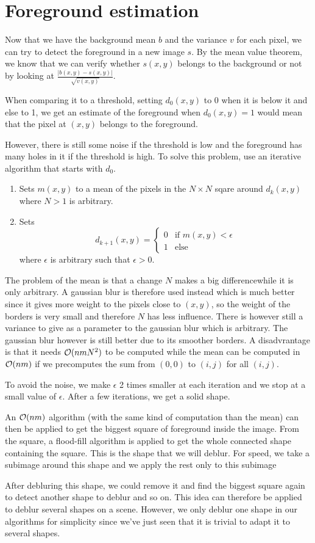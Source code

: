 \section{Foreground estimation}
Now that we have the background mean $b$ and the variance $v$ for each
pixel, we can try to detect the foreground in a new image $s$.
By the mean value theorem, we know that we can
verify whether $s(x,y)$ belongs to the background or not
by looking at $\frac{|b(x,y) - s(x,y)|}{\sqrt{v(x,y)}}$.

When comparing it to a threshold, setting $d_0(x,y)$ to 0
when it is below it and else to 1, we
get an estimate of the foreground when $d_0(x,y) = 1$ would mean
that the pixel at $(x,y)$ belongs to the foreground.

However, there is still some noise if the threshold is low
and the foreground has many holes in it if the threshold is high.
To solve this problem, use an iterative algorithm that starts with $d_0$.
\begin{enumerate}
  \item Sets $m(x,y)$ to a mean of the pixels in the $N \times N$ sqare around $d_{k}(x,y)$ where $N > 1$ is arbitrary.
  \item Sets
    \[ d_{k+1}(x,y) =
      \begin{cases}
        0 & \text{if }m(x,y) < \epsilon\\
        1 & \text{else}
      \end{cases}
    \]
    where $\epsilon$ is arbitrary such that $\epsilon > 0$.
\end{enumerate}
The problem of the mean is that a change $N$ makes a big differencewhile it is only arbitrary.
A gaussian blur is therefore used instead which is much better since it gives more weight to the pixels close to $(x,y)$, so the weight of the borders is very small and therefore $N$ has less influence.
There is however still a variance to give as a parameter to the gaussian blur which is arbitrary.
The gaussian blur however is still better due to its smoother borders.
A disadvrantage is that it needs $\mathcal{O}(nmN^2)$ to be computed while the mean can be computed in $\mathcal{O}(nm)$ if we precomputes the sum from $(0,0)$ to $(i,j)$ for all $(i,j)$.

To avoid the noise, we make $\epsilon$ 2 times smaller at each iteration and we stop at a small value of $\epsilon$.
After a few iterations, we get a solid shape.

An $\mathcal{O}(nm)$ algorithm (with the same kind of computation than the mean) can then be applied to get the biggest square of foreground inside the image.
From the square, a flood-fill algorithm is applied to get the whole connected shape containing the square.
This is the shape that we will deblur.
For speed, we take a subimage around this shape and we apply the rest only to this subimage

After debluring this shape, we could remove it and find the biggest square again to detect another shape to deblur and so on.
This idea can therefore be applied to deblur several shapes on a scene.
However, we only deblur one shape in our algorithms for simplicity
since we've just seen that it is trivial to adapt it to several shapes.
